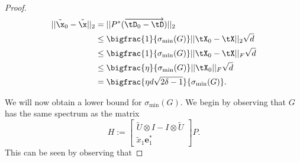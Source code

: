 \begin{proof}
\begin{align}\label{eq:perturb_bound}
||\tilde{\x}_0 - \tilde{\x}||_2 & =  ||P^* (\overrightarrow{\tD_0 - \tD})||_2 \nonumber\\
& \le  \bigfrac{1}{\sigma_{\min}(G)} ||\tX_0 - \tX||_2 \sqrt{d} \nonumber\\
& \le  \bigfrac{1}{\sigma_{\min}(G)} ||\tX_0 - \tX||_F \sqrt{d} \nonumber\\
& \le   \bigfrac{\eta}{\sigma_{\min}(G)} ||\tX_0||_F \sqrt{d} \nonumber\\
& =  \bigfrac{\eta d \sqrt{2\delta - 1}}{\sigma_{\min}(G)}.
\end{align}

We will now obtain a lower bound for $\sigma_{\min}(G)$.  We begin by observing that $G$ has the same spectrum as the matrix \
\[H  :=  \begin{bmatrix} \tilde{U} \otimes I - I \otimes \tilde{U} \\ \tilde{x}_1 \mathbf{e}_1^* \end{bmatrix} P. \]
This can be seen by observing that 


\end{proof}
